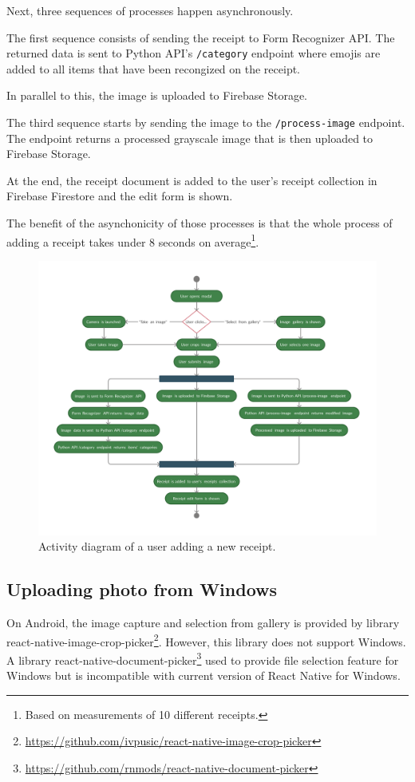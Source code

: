 \documentclass[
  digital, %
  table,   %
  oneside, %
  lof,     %
  lot,     %
]{fithesis3}
\begin{document}
Next, three sequences of processes happen asynchronously.

The first sequence consists of sending the receipt to Form Recognizer API. The returned data is sent to Python API's \texttt{/category} endpoint where emojis are added to all items that have been recongized on the receipt.

In parallel to this, the image is uploaded to Firebase Storage.

The third sequence starts by sending the image to the \texttt{/process-image} endpoint. The endpoint returns a processed grayscale image that is then uploaded to Firebase Storage.

At the end, the receipt document is added to the user's receipt collection in Firebase Firestore and the edit form is shown. 

The benefit of the asynchonicity of those processes is that the whole process of adding a receipt takes under 8 seconds on average\footnote{Based on measurements of 10 different receipts.}.

\begin{figure}
    \begin{center}
        \includegraphics[width=\textwidth]{figures/diagrams/Add_receipt_Android}
    \end{center}
    \caption{Activity diagram of a user adding a new receipt.}
    \label{fig:add_receipt_android}
\end{figure}

\subsection{Uploading photo from Windows}
On Android, the image capture and selection from gallery is provided by library react-native-image-crop-picker\footnote{\url{https://github.com/ivpusic/react-native-image-crop-picker}}. However, this library does not support Windows. A library react-native-document-picker\footnote{\url{https://github.com/rnmods/react-native-document-picker}} used to provide file selection feature for Windows but is incompatible with current version of React Native for Windows. 
\end{document}
